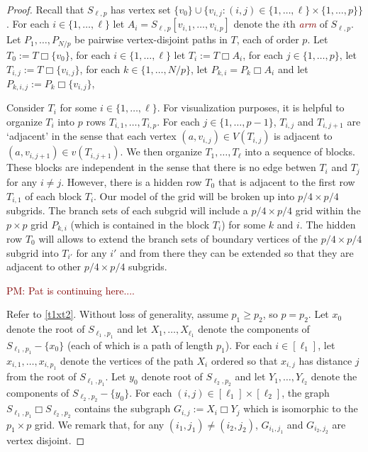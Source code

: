 \documentclass[lotsofwhite]{patmorin}
\newcommand{\defn}[1]{\textcolor{Maroon}{\emph{#1}}}
\newcommand{\boxprod}{\mathbin{\Box}}
\renewcommand{\ge}{\geqslant}
\newcommand{\pat}[1]{\textcolor{Maroon}{PM: #1}}
\theoremstyle{plain}
\theoremstyle{definition}
\begin{document}
\begin{proof}
  Recall that $S_{\ell,p}$ has vertex set $\{v_0\}\cup\{v_{i,j}:(i,j)\in \{1,\ldots,\ell\}\times\{1,\ldots,p\}\}$. For each $i\in\{1,\ldots,\ell\}$ let $A_i=S_{\ell,p}[v_{i,1},\ldots,v_{i,p}]$ denote the $i$th \defn{arm} of $S_{\ell,p}$.  Let $P_1,\ldots,P_{N/p}$ be pairwise vertex-disjoint paths in $T$, each of order $p$.  Let $T_0:=T\boxprod \{v_0\}$, for each $i\in\{1,\ldots,\ell\}$ let $T_i:=T\boxprod A_i$, for each $j\in \{1,\ldots,p\}$, let $T_{i,j}:=T\boxprod \{v_{i,j}\}$, for each $k\in\{1,\ldots,N/p\}$, let $P_{k,i}=P_k\boxprod A_i$ and let $P_{k,i,j}:=P_k\boxprod \{v_{i,j}\}$,

  Consider $T_i$ for some $i\in\{1,\ldots,\ell\}$. For visualization purposes, it is helpful to organize $T_i$ into $p$ rows $T_{i,1},\ldots,T_{i,p}$.  For each $j\in\{1,\ldots,p-1\}$, $T_{i,j}$ and $T_{i,j+1}$ are `adjacent' in the sense that each vertex $(a,v_{i,j})\in V(T_{i,j})$ is adjacent to $(a,v_{i,j+1})\in v(T_{i,j+1})$.  We then organize $T_1,\ldots,T_{\ell}$ into a sequence of blocks. These blocks are independent in the sense that there is no edge betwen $T_{i}$ and $T_j$ for any $i\neq j$.  However, there is a hidden row $T_0$ that is adjacent to the first row $T_{i,1}$ of each block $T_i$. Our model of the grid will be broken up into $p/4\times p/4$ subgrids. The branch sets of each subgrid will include a $p/4\times p/4$ grid within the $p\times p$ grid $P_{k,i}$ (which is contained in the block $T_i$) for some $k$ and $i$.  The hidden row $T_0$ will allows to extend the branch sets of boundary vertices of the $p/4\times p/4$ subgrid into $T_{i'}$ for any $i'$ and from there they can be extended so that they are adjacent to other $p/4\times p/4$ subgrids. 

  \pat{Pat is continuing here....}


  Refer to \cref{t1xt2}.
  Without loss of generality, assume $p_1\ge p_2$, so $p=p_2$.    Let $x_0$ denote the root of $S_{\ell_1,p_1}$ and let $X_1,\ldots,X_{\ell_1}$ denote the components of $S_{\ell_1,p_1}-\{x_0\}$ (each of which is a path of length  $p_1$).  For each $i\in[\ell_1]$, let $x_{i,1},\ldots,x_{i,p_1}$ denote the vertices of the path $X_i$ ordered so that $x_{i,j}$ has distance $j$ from the root of $S_{\ell_1,p_1}$.   Let $y_0$ denote root of $S_{\ell_2,p_2}$ and let $Y_1,\ldots,Y_{\ell_2}$ denote the components of $S_{\ell_2,p_2}-\{y_0\}$.  For each $(i,j)\in [\ell_1]\times [\ell_2]$, the graph $S_{\ell_1,p_1}\boxprod S_{\ell_2,p_2}$ contains the subgraph $G_{i,j}:=X_i\boxprod Y_j$ which is isomorphic to the $p_1\times p$ grid. We remark that, for any $(i_1,j_1)\neq(i_2,j_2)$, $G_{i_1,j_1}$ and $G_{i_2,j_2}$ are vertex disjoint.


\end{proof}
\end{document}
